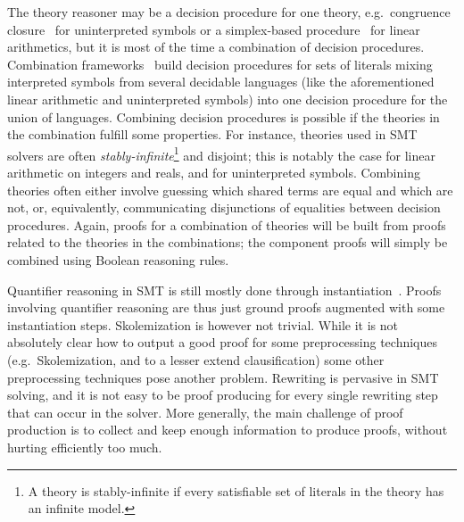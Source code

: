 \documentclass{llncs}
\newcommand{\Note}[1]{\textcolor{blue}{[#1]}}
\begin{document}
The theory reasoner may be a decision procedure for one theory, e.g.\ congruence
closure~\cite{Nelson2,Nieuwenhuis6} for uninterpreted symbols or a simplex-based
procedure~\cite{Dutertre1} for linear arithmetics, but it is most of the time a
combination of decision procedures.  Combination
frameworks~\cite{Nelson3,Tinelli1} build decision procedures for sets of
literals mixing interpreted symbols from several decidable languages (like the
aforementioned linear arithmetic and uninterpreted symbols) into one decision
procedure for the union of languages.  Combining decision procedures is possible
if the theories in the combination fulfill some properties.  For instance,
theories used in SMT solvers are often \emph{stably-infinite}\footnote{A theory
  is stably-infinite if every satisfiable set of literals in the theory has an
  infinite model.} and disjoint; this is notably the case for linear arithmetic
on integers and reals, and for uninterpreted symbols.  Combining theories often
either involve guessing which shared terms are equal and which are not, or,
equivalently, communicating disjunctions of equalities between decision
procedures.  Again, proofs for a combination of theories will be built from
proofs related to the theories in the combinations; the component proofs will
simply be combined using Boolean reasoning rules.

Quantifier reasoning in SMT is still mostly done through
instantiation~\cite{Moura9}.  Proofs involving quantifier reasoning are thus
just ground proofs augmented with some instantiation steps.  Skolemization is
however not trivial.  While it is not absolutely clear how to output a good
proof for some preprocessing techniques (e.g.\ Skolemization, and to a lesser
extend clausification) some other preprocessing techniques pose another problem.
Rewriting is pervasive in SMT solving, and it is not easy to be proof producing
for every single rewriting step that can occur in the solver.  More generally,
the main challenge of proof production is to collect and keep enough information
to produce proofs, without hurting efficiently too much.

\end{document}
